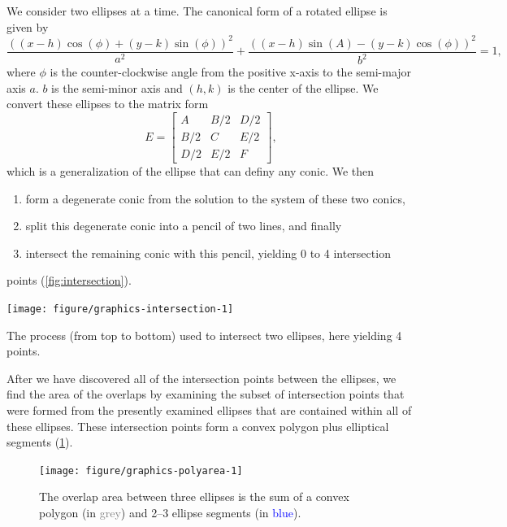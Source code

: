 \documentclass[a4paper,nofonts,nobib,titlepage,justified,marginals=raggedouter,nohyper]{tufte-handout}\usepackage[]{graphicx}\usepackage[]{color}
\newenvironment{knitrout}{}{} %
\begin{document}
We consider two ellipses at a time. The canonical form of a rotated
ellipse is given by
\[
\frac{((x-h)\cos(\phi)+(y-k)\sin(\phi))^2}{a^2}+\frac{((x-h) \sin(A)-(y-k)
  \cos(\phi))^2}{b^2} = 1,
\]
where $\phi$ is the counter-clockwise angle from the positive x-axis to the
semi-major axis $a$. $b$ is the semi-minor axis and $(h, k)$ is the center
of the ellipse. We convert these ellipses to the matrix form
\[
E = \begin{bmatrix}A & B/2 & D/2 \\
                   B/2 & C & E/2 \\
                   D/2 & E/2 & F
    \end{bmatrix},
\]
which is a generalization of the ellipse that can definy any conic. We then
\begin{enumerate}
\item form a degenerate conic from the solution to the system of these two conics,
\item split this degenerate conic into a pencil of two lines, and finally
\item intersect the remaining conic with this pencil, yielding 0 to 4 intersection
\end{enumerate}
points (\cref{fig:intersection}).

\begin{marginfigure}%
\begin{knitrout}
\color{fgcolor}

{\centering \texttt{[image: figure/graphics-intersection-1]} 

}



\end{knitrout}
\caption{The process (from top to bottom) used to intersect two ellipses, here yielding 4 points.}
\label{fig:intersection}
\end{marginfigure}

After we have discovered all of the intersection points between the ellipses,
we find the area of the overlaps by examining the subset of intersection
points that were formed from the presently examined ellipses that are contained
within all of these ellipses. These intersection points form a convex polygon
plus elliptical segments (\cref{fig:polyarea}).

\begin{figure}[hbtp!]
\begin{knitrout}
\color{fgcolor}

{\centering \texttt{[image: figure/graphics-polyarea-1]} 

}



\end{knitrout}
\label{fig:polyarea}
\caption{The overlap area between three ellipses is the sum of a convex polygon (in \textcolor{grey}{grey}) and 2--3 ellipse segments (in \textcolor{blue}{blue}).}
\end{figure}
\end{document}
